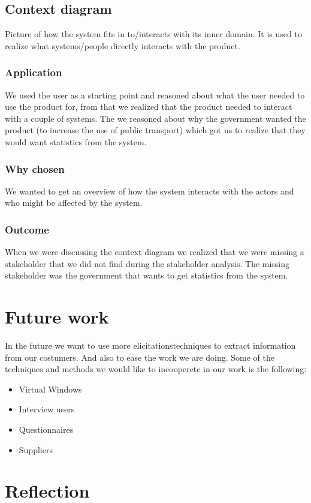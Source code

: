 \documentclass[a4paper]{article}
\begin{document}
    \subsection{Context diagram} \label{subsec:context}
	Picture of how the system fits in to/interacts with its inner domain. It is used to realize what systems/people directly interacts with the product.
    \subsubsection{Application}
    We used the user as a starting point and reasoned about what the user needed to use the product for, from that we realized that the product needed to interact with a couple of systems. The we reasoned about why the government wanted the product (to increase the use of public transport) which got us to realize that they would want statistics from the system.
    \subsubsection{Why chosen}
    We wanted to get an overview of how the system interacts with the actors and who might be affected by the system.
    \subsubsection{Outcome}
	When we were discussing the context diagram we realized that we were missing a stakeholder that we did not find during the stakeholder analysis. The missing stakeholder was the government that wants to get statistics from the system. 

  \section{Future work}

  In the future we want to use more elicitationstechniques to extract information from our costumers. And also to ease the work we are doing.
  Some of the techniques and methods we would like to incooperete in our work is the following:
  \begin{itemize}
  	\item Virtual Windows
  	\item Interview users
  	\item Questionnaires
  	\item Suppliers 
  \end{itemize}
 
  \section{Reflection}
\end{document}
